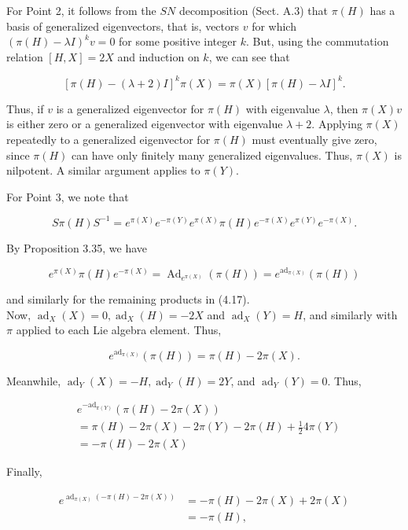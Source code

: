 \documentclass[10pt, letterpaper]{article}
\begin{document}
For Point 2, it follows from the $S N$ decomposition (Sect. A.3) that $\pi(H)$ has a basis of generalized eigenvectors, that is, vectors $v$ for which $(\pi(H)-\lambda I)^{k} v=0$ for some positive integer $k$. But, using the commutation relation $[H, X]=2 X$ and induction on $k$, we can see that

$$
[\pi(H)-(\lambda+2) I]^{k} \pi(X)=\pi(X)[\pi(H)-\lambda I]^{k} .
$$

Thus, if $v$ is a generalized eigenvector for $\pi(H)$ with eigenvalue $\lambda$, then $\pi(X) v$ is either zero or a generalized eigenvector with eigenvalue $\lambda+2$. Applying $\pi(X)$ repeatedly to a generalized eigenvector for $\pi(H)$ must eventually give zero, since $\pi(H)$ can have only finitely many generalized eigenvalues. Thus, $\pi(X)$ is nilpotent. A similar argument applies to $\pi(Y)$.

For Point 3, we note that

$$
S \pi(H) S^{-1}=e^{\pi(X)} e^{-\pi(Y)} e^{\pi(X)} \pi(H) e^{-\pi(X)} e^{\pi(Y)} e^{-\pi(X)} .
$$

By Proposition 3.35, we have

$$
e^{\pi(X)} \pi(H) e^{-\pi(X)}=\operatorname{Ad}_{e^{\pi(X)}}(\pi(H))=e^{\operatorname{ad}_{\pi(X)}}(\pi(H))
$$

and similarly for the remaining products in (4.17).\\
Now, $\operatorname{ad}_{X}(X)=0, \operatorname{ad}_{X}(H)=-2 X$ and $\operatorname{ad}_{X}(Y)=H$, and similarly with $\pi$ applied to each Lie algebra element. Thus,

$$
e^{\mathrm{ad}_{\pi(X)}}(\pi(H))=\pi(H)-2 \pi(X) .
$$

Meanwhile, $\operatorname{ad}_{Y}(X)=-H, \operatorname{ad}_{Y}(H)=2 Y$, and $\operatorname{ad}_{Y}(Y)=0$. Thus,

$$
\begin{aligned}
& e^{-\mathrm{ad}_{\pi(Y)}}(\pi(H)-2 \pi(X)) \\
& =\pi(H)-2 \pi(X)-2 \pi(Y)-2 \pi(H)+\frac{1}{2} 4 \pi(Y) \\
& =-\pi(H)-2 \pi(X)
\end{aligned}
$$

Finally,

$$
\begin{aligned}
e^{\operatorname{ad}_{\pi(X)}(-\pi(H)-2 \pi(X))} & =-\pi(H)-2 \pi(X)+2 \pi(X) \\
& =-\pi(H),
\end{aligned}
$$
\end{document}
